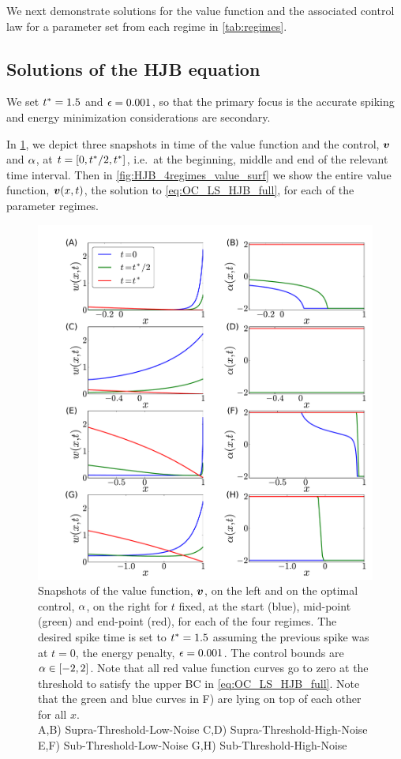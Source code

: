 \documentclass[12pt]{iopart}
\begin{document}
We next demonstrate solutions for the value function and the associated
control law for a parameter set from each regime in \cref{tab:regimes}.

\subsection{Solutions of the HJB equation} 
We set ${ t^* }=1.5$ and ${\epsilon} = 0.001$, so that the primary focus is the accurate
spiking and energy minimization considerations are secondary.

In \cref{fig:HJB_4regimes_value_control_cuts}, we depict three snapshots in time
of the value function and the control, ${ \boldsymbol{v} }$ and ${\alpha}$, at $t = [0,{ t^* }/2, { t^* }]$,
i.e.\ at the beginning, middle and end of the relevant time interval. Then in
\cref{fig:HJB_4regimes_value_surf} we show the entire value function, ${ \boldsymbol{v} }(x,t)$,
the solution to \cref{eq:OC_LS_HJB_full}, for each of the parameter regimes.
\begin{figure}[htp]
\begin{center}
  \includegraphics[width=\textwidth]{Figs/HJB/Regimes_vc_cuts.pdf}
  \caption[labelInTOC]{Snapshots of the value function, ${ \boldsymbol{v} }$, on the left and on
  the optimal control, ${\alpha}$, on the right for $t$ fixed, at the start (blue),
  mid-point (green) and end-point (red), for each of the four regimes.
  The desired spike time is set to ${ t^* }=1.5$ assuming the previous spike was at
  $t=0$, the energy penalty, ${\epsilon} = 0.001$. The control bounds are ${\alpha} \in
  [-2,2]$. 
  Note that all red value function curves go to zero at the threshold to satisfy
  the upper BC in \cref{eq:OC_LS_HJB_full}.
  Note that the green and blue
  curves in F) are lying on top of each other for all $x$.
  \\
  A,B) Supra-Threshold-Low-Noise
  C,D) Supra-Threshold-High-Noise
  E,F) Sub-Threshold-Low-Noise
  G,H) Sub-Threshold-High-Noise
  }
\label{fig:HJB_4regimes_value_control_cuts}
\end{center}
\end{figure}
\end{document}
